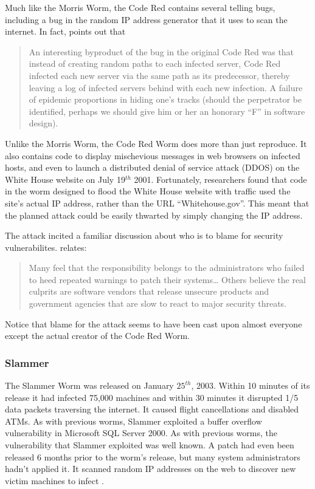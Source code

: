 Much like the Morris Worm, the Code Red contains several telling bugs, including
a bug in the random IP address generator that it uses to scan the internet. In
fact, \cite{berghel_code_2001} points out that
\begin{quote}
An interesting byproduct of the bug in the original Code Red was that instead 
of creating random paths to each infected server, Code Red infected each new
server via the same path as its predecessor, thereby leaving a log of infected
servers behind with each new infection. A failure of epidemic proportions in
hiding one's tracks (should the perpetrator be identified, perhaps we should
give him or her an honorary ``F'' in software design).
\end{quote}

Unlike the Morris Worm, the Code Red Worm does more than just reproduce. It also
contains code to display mischevious messages in web browsers on infected hosts,
and even to launch a distributed denial of service attack (DDOS) on the White
House website on July 19$^{th}$ 2001. Fortunately, researchers found that code
in the worm designed to flood the White House website with traffic used the
site's actual IP address, rather than the URL ``Whitehouse.gov''. This meant
that the planned attack could be easily thwarted by simply changing the IP
address\cite{berghel_code_2001}.

The attack incited a familiar discussion about who is to blame for security
vulnerabilites. \cite{berghel_code_2001} relates:
\begin{quote}
Many feel that the responsibility belongs to the administrators who failed to
heed repeated warnings to patch their systems\ldots
Others believe the real culprits are software vendors that release unsecure
products and government agencies that are slow to react to major security threats.
\end{quote}

Notice that blame for the attack seems to have been cast upon almost everyone
except the actual creator of the Code Red Worm.

\subsubsection*{Slammer}
The Slammer Worm was released on January $25^{th}$, 2003. Within 10 minutes of
its release it had infected 75,000 machines and within 30 minutes it disrupted
1/5 data packets traversing the internet. It caused
flight cancellations and disabled ATMs. As with previous worms, Slammer
exploited a buffer overflow vulnerability in Microsoft SQL Server 2000. As with
previous worms, the vulnerability that Slammer exploited was well known. A
patch had even been released 6 months prior to the worm's release, but many
system administrators hadn't applied it. It scanned random IP addresses on the
web to discover new victim machines to infect
\cite{tynan_dawn_2003}\cite{panko_slammer:_2003}.

